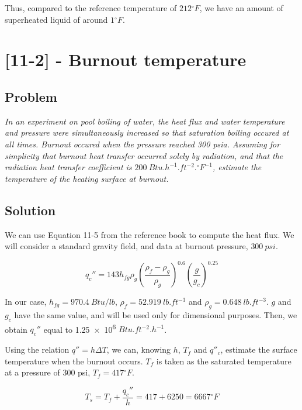 Thus, compared to the reference temperature of $212{}^\circ F$, we have an amount of superheated liquid of around $1{}^\circ F$.


\section{[11-2] - Burnout temperature}
\label{prob101}

\subsection{Problem}
\textit{In an experiment on pool boiling of water, the heat flux and water temperature and pressure were simultaneously increased so that saturation boiling occured at all times. Burnout occured when the pressure reached 300 psia. Assuming for simplicity that burnout heat transfer occurred solely by radiation, and that the radiation heat transfer coefficient is $200\ Btu.h^{-1}.ft^{-2}.{}^\circ F^{-1}$, estimate the temperature of the heating surface at burnout.} 

\subsection{Solution}


We can use Equation 11-5 from the reference book to compute the heat flux. We will consider a standard gravity field, and data at burnout pressure, $300\ psi$.

\begin{equation}
q_c'' = 143 h_{fg} \rho_g \left( \frac{\rho_f - \rho_g}{\rho_g} \right)^{0.6} \left( \frac{g}{g_c} \right)^{0.25}
\end{equation}

In our case, $h_{fg} = 970.4\ Btu/lb$, $\rho_f = 52.919\ lb.ft^{-3}$ and $\rho_g = 0.648\ lb.ft^{-3}$. $g$ and $g_c$ have the same value, and will be used only for dimensional purposes. Then, we obtain $q_c''$ equal to \num{1.25e6} $Btu.ft^{-2}.h^{-1}$.

Using the relation $q'' = h\Delta T$, we can, knowing $h$, $T_f$ and $q''_c$, estimate the surface temperature when the burnout occurs. $T_f$ is taken as the saturated temperature at a pressure of 300 psi, $T_f = 417{}^\circ F$.

\begin{equation}
T_s = T_f + \frac{q_c''}{h} = 417 + 6250 = 6667{}^\circ F
\end{equation}



